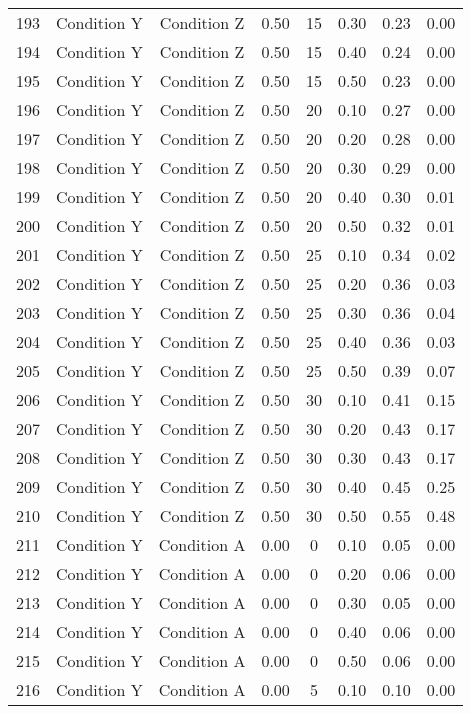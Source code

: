 \begin{landscape}
\begin{longtable}{cc cc cc cc}
  193 & Condition Y & Condition Z & 0.50 &  15 & 0.30 & 0.23 & 0.00 \\ 
  194 & Condition Y & Condition Z & 0.50 &  15 & 0.40 & 0.24 & 0.00 \\ 
  195 & Condition Y & Condition Z & 0.50 &  15 & 0.50 & 0.23 & 0.00 \\ 
  196 & Condition Y & Condition Z & 0.50 &  20 & 0.10 & 0.27 & 0.00 \\ 
  197 & Condition Y & Condition Z & 0.50 &  20 & 0.20 & 0.28 & 0.00 \\ 
  198 & Condition Y & Condition Z & 0.50 &  20 & 0.30 & 0.29 & 0.00 \\ 
  199 & Condition Y & Condition Z & 0.50 &  20 & 0.40 & 0.30 & 0.01 \\ 
  200 & Condition Y & Condition Z & 0.50 &  20 & 0.50 & 0.32 & 0.01 \\ 
  201 & Condition Y & Condition Z & 0.50 &  25 & 0.10 & 0.34 & 0.02 \\ 
  202 & Condition Y & Condition Z & 0.50 &  25 & 0.20 & 0.36 & 0.03 \\ 
  203 & Condition Y & Condition Z & 0.50 &  25 & 0.30 & 0.36 & 0.04 \\ 
  204 & Condition Y & Condition Z & 0.50 &  25 & 0.40 & 0.36 & 0.03 \\ 
  205 & Condition Y & Condition Z & 0.50 &  25 & 0.50 & 0.39 & 0.07 \\ 
  206 & Condition Y & Condition Z & 0.50 &  30 & 0.10 & 0.41 & 0.15 \\ 
  207 & Condition Y & Condition Z & 0.50 &  30 & 0.20 & 0.43 & 0.17 \\ 
  208 & Condition Y & Condition Z & 0.50 &  30 & 0.30 & 0.43 & 0.17 \\ 
  209 & Condition Y & Condition Z & 0.50 &  30 & 0.40 & 0.45 & 0.25 \\ 
  210 & Condition Y & Condition Z & 0.50 &  30 & 0.50 & 0.55 & 0.48 \\ 
  \hline
  211 & Condition Y & Condition A & 0.00 &   0 & 0.10 & 0.05 & 0.00 \\ 
  212 & Condition Y & Condition A & 0.00 &   0 & 0.20 & 0.06 & 0.00 \\ 
  213 & Condition Y & Condition A & 0.00 &   0 & 0.30 & 0.05 & 0.00 \\ 
  214 & Condition Y & Condition A & 0.00 &   0 & 0.40 & 0.06 & 0.00 \\ 
  215 & Condition Y & Condition A & 0.00 &   0 & 0.50 & 0.06 & 0.00 \\ 
  216 & Condition Y & Condition A & 0.00 &   5 & 0.10 & 0.10 & 0.00 \\ 

\end{longtable}
\end{landscape}
